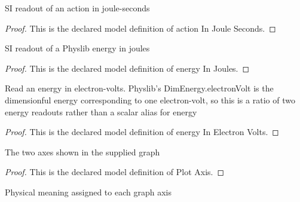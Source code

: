 \begin{definition}
  \label{def:physics:phyx-mini-0515:phyxminiproblems-problemphyxmini0515-actioninjouleseconds}
  SI readout of an action in joule-seconds
\end{definition}
\begin{proof}
  This is the declared model definition of action In Joule Seconds.
\end{proof}
\begin{definition}
  \label{def:physics:phyx-mini-0515:phyxminiproblems-problemphyxmini0515-energyinjoules}
  SI readout of a Physlib energy in joules
\end{definition}
\begin{proof}
  This is the declared model definition of energy In Joules.
\end{proof}
\begin{definition}
  \label{def:physics:phyx-mini-0515:phyxminiproblems-problemphyxmini0515-energyinelectronvolts}
  Read an energy in electron-volts. Physlib's DimEnergy.electronVolt is the dimensionful energy corresponding to one electron-volt, so this is a ratio of two energy readouts rather than a scalar alias for energy
\end{definition}
\begin{proof}
  This is the declared model definition of energy In Electron Volts.
\end{proof}
\begin{definition}
  \label{def:physics:phyx-mini-0515:phyxminiproblems-problemphyxmini0515-plotaxis}
  The two axes shown in the supplied graph
\end{definition}
\begin{proof}
  This is the declared model definition of Plot Axis.
\end{proof}
\begin{definition}
  \label{def:physics:phyx-mini-0515:phyxminiproblems-problemphyxmini0515-plotaxisrole}
  Physical meaning assigned to each graph axis
\end{definition}

